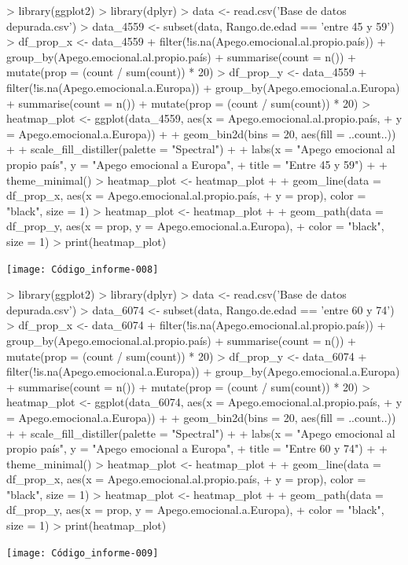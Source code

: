 \documentclass{article}
\begin{document}
\newpage
\begin{Schunk}
\begin{Sinput}
> library(ggplot2)
> library(dplyr)
> data <- read.csv('Base de datos depurada.csv')
> data_4559 <- subset(data, Rango.de.edad == 'entre 45 y 59')
> df_prop_x <- data_4559 %
+   filter(!is.na(Apego.emocional.al.propio.país)) %
+   group_by(Apego.emocional.al.propio.país) %
+   summarise(count = n()) %
+   mutate(prop = (count / sum(count)) * 20)
> df_prop_y <- data_4559 %
+   filter(!is.na(Apego.emocional.a.Europa)) %
+   group_by(Apego.emocional.a.Europa) %
+   summarise(count = n()) %
+   mutate(prop = (count / sum(count)) * 20)
> heatmap_plot <- ggplot(data_4559, aes(x = Apego.emocional.al.propio.país,
+                                  y = Apego.emocional.a.Europa)) +
+   geom_bin2d(bins = 20, aes(fill = ..count..)) +
+   scale_fill_distiller(palette = "Spectral") +
+   labs(x = "Apego emocional al propio país", y = "Apego emocional a Europa",
+        title = "Entre 45 y 59") +
+   theme_minimal()
> heatmap_plot <- heatmap_plot +
+   geom_line(data = df_prop_x, aes(x = Apego.emocional.al.propio.país,
+                                   y = prop), color = "black", size = 1)
> heatmap_plot <- heatmap_plot +
+   geom_path(data = df_prop_y, aes(x = prop, y = Apego.emocional.a.Europa),
+             color = "black", size = 1)
> print(heatmap_plot)
\end{Sinput}
\end{Schunk}
\texttt{[image: Código\_informe-008]}

\newpage
\begin{Schunk}
\begin{Sinput}
> library(ggplot2)
> library(dplyr)
> data <- read.csv('Base de datos depurada.csv')
> data_6074 <- subset(data, Rango.de.edad == 'entre 60 y 74')
> df_prop_x <- data_6074 %
+   filter(!is.na(Apego.emocional.al.propio.país)) %
+   group_by(Apego.emocional.al.propio.país) %
+   summarise(count = n()) %
+   mutate(prop = (count / sum(count)) * 20)
> df_prop_y <- data_6074 %
+   filter(!is.na(Apego.emocional.a.Europa)) %
+   group_by(Apego.emocional.a.Europa) %
+   summarise(count = n()) %
+   mutate(prop = (count / sum(count)) * 20)
> heatmap_plot <- ggplot(data_6074, aes(x = Apego.emocional.al.propio.país,
+                                  y = Apego.emocional.a.Europa)) +
+   geom_bin2d(bins = 20, aes(fill = ..count..)) +
+   scale_fill_distiller(palette = "Spectral") +
+   labs(x = "Apego emocional al propio país", y = "Apego emocional a Europa",
+        title = "Entre 60 y 74") +
+   theme_minimal()
> heatmap_plot <- heatmap_plot +
+   geom_line(data = df_prop_x, aes(x = Apego.emocional.al.propio.país,
+                                   y = prop), color = "black", size = 1)
> heatmap_plot <- heatmap_plot +
+   geom_path(data = df_prop_y, aes(x = prop, y = Apego.emocional.a.Europa),
+             color = "black", size = 1)
> print(heatmap_plot)
\end{Sinput}
\end{Schunk}
\texttt{[image: Código\_informe-009]}
\end{document}
